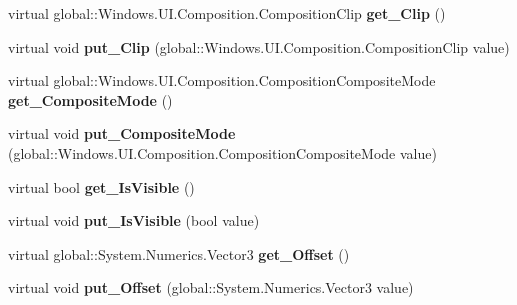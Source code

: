 \begin{DoxyCompactItemize}
virtual global\+::\+Windows.\+U\+I.\+Composition.\+Composition\+Clip {\bfseries get\+\_\+\+Clip} ()
\item 
\mbox{\label{class_windows_1_1_u_i_1_1_composition_1_1_visual_a1d62ae483edf07661fa132e98c1d1dbf}} 
virtual void {\bfseries put\+\_\+\+Clip} (global\+::\+Windows.\+U\+I.\+Composition.\+Composition\+Clip value)
\item 
\mbox{\label{class_windows_1_1_u_i_1_1_composition_1_1_visual_a51075ac8d9a733304f167464da6c84b8}} 
virtual global\+::\+Windows.\+U\+I.\+Composition.\+Composition\+Composite\+Mode {\bfseries get\+\_\+\+Composite\+Mode} ()
\item 
\mbox{\label{class_windows_1_1_u_i_1_1_composition_1_1_visual_ad6c8a2e02e7ec62e2dd9406efe0e37b1}} 
virtual void {\bfseries put\+\_\+\+Composite\+Mode} (global\+::\+Windows.\+U\+I.\+Composition.\+Composition\+Composite\+Mode value)
\item 
\mbox{\label{class_windows_1_1_u_i_1_1_composition_1_1_visual_a3a7d203bd59ea8d7b4bc1978ab0fa1f9}} 
virtual bool {\bfseries get\+\_\+\+Is\+Visible} ()
\item 
\mbox{\label{class_windows_1_1_u_i_1_1_composition_1_1_visual_a81c567ec2b046085736b6354b159e7cd}} 
virtual void {\bfseries put\+\_\+\+Is\+Visible} (bool value)
\item 
\mbox{\label{class_windows_1_1_u_i_1_1_composition_1_1_visual_a905246c15eda186bee3efd6359a4ad4b}} 
virtual global\+::\+System.\+Numerics.\+Vector3 {\bfseries get\+\_\+\+Offset} ()
\item 
\mbox{\label{class_windows_1_1_u_i_1_1_composition_1_1_visual_a5ae1120de010788273be8a5ba125758b}} 
virtual void {\bfseries put\+\_\+\+Offset} (global\+::\+System.\+Numerics.\+Vector3 value)
\item 
\mbox{\label{class_windows_1_1_u_i_1_1_composition_1_1_visual_aefe015d14edbd0b01c59658d842ee6b6}} 

\end{DoxyCompactItemize}
